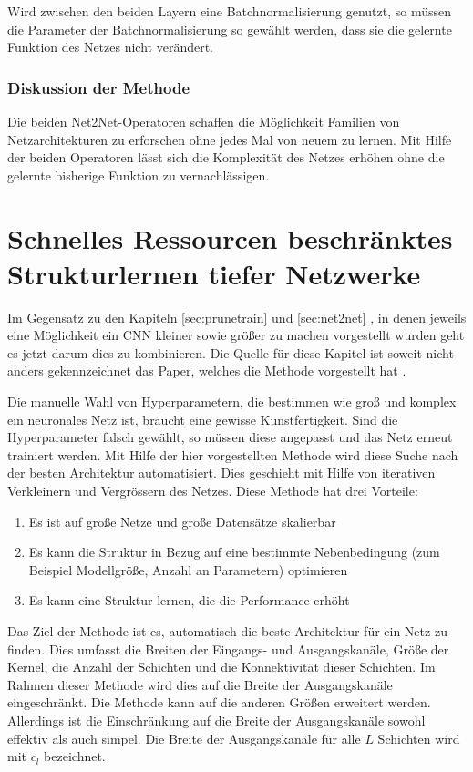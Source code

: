 Wird zwischen den beiden Layern eine Batchnormalisierung genutzt, so müssen die Parameter der Batchnormalisierung so gewählt werden, dass sie die gelernte Funktion des Netzes nicht verändert.


\subsubsection{Diskussion der Methode}

Die beiden Net2Net-Operatoren schaffen die Möglichkeit Familien von Netzarchitekturen zu erforschen ohne jedes Mal von neuem zu lernen. Mit Hilfe der beiden Operatoren lässt sich die Komplexität des Netzes erhöhen ohne die gelernte bisherige Funktion zu vernachlässigen.


\section{Schnelles Ressourcen beschränktes Strukturlernen tiefer Netzwerke}\label{sec:morphnet}
Im Gegensatz zu den Kapiteln \ref{sec:prunetrain} und \ref{sec:net2net} , in denen jeweils eine Möglichkeit ein CNN kleiner sowie größer zu machen vorgestellt wurden geht es jetzt darum dies zu kombinieren. Die Quelle für diese Kapitel ist soweit nicht anders gekennzeichnet das Paper, welches die Methode vorgestellt hat \cite{morphnet}.

Die manuelle Wahl von Hyperparametern, die bestimmen wie groß und komplex ein neuronales Netz ist, braucht eine gewisse Kunstfertigkeit. Sind die Hyperparameter falsch gewählt, so müssen diese angepasst und das Netz erneut trainiert werden. Mit Hilfe der hier vorgestellten Methode wird diese Suche nach der besten Architektur automatisiert. Dies geschieht mit Hilfe von iterativen Verkleinern und Vergrössern des Netzes. Diese Methode hat drei Vorteile:
\begin{enumerate}
 \item Es ist auf große Netze und große Datensätze skalierbar
 \item Es kann die Struktur in Bezug auf eine bestimmte Nebenbedingung (zum Beispiel Modellgröße, Anzahl an Parametern) optimieren
 \item Es kann eine Struktur lernen, die die Performance erhöht
\end{enumerate}

Das Ziel der Methode ist es, automatisch die beste Architektur für ein Netz zu finden. Dies umfasst die Breiten der Eingangs- und Ausgangskanäle, Größe der Kernel, die Anzahl der Schichten und die Konnektivität dieser Schichten. Im Rahmen dieser Methode wird dies auf die Breite der Ausgangskanäle eingeschränkt. Die Methode kann auf die anderen Größen erweitert werden. Allerdings ist die Einschränkung auf die Breite der Ausgangskanäle sowohl effektiv als auch simpel.
Die Breite der Ausgangskanäle für alle $L$ Schichten wird mit $c_l$ bezeichnet. 

